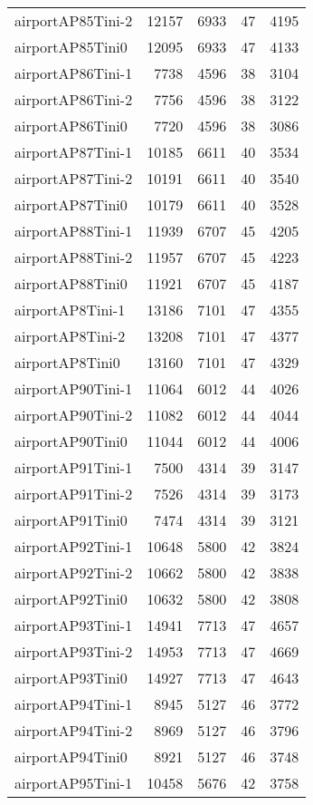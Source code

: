\begin{longtable}{lrrrr}
airportAP85Tini-2 & 12157 & 6933 & 47 & 4195 \\
airportAP85Tini0 & 12095 & 6933 & 47 & 4133 \\
airportAP86Tini-1 & 7738 & 4596 & 38 & 3104 \\
airportAP86Tini-2 & 7756 & 4596 & 38 & 3122 \\
airportAP86Tini0 & 7720 & 4596 & 38 & 3086 \\
airportAP87Tini-1 & 10185 & 6611 & 40 & 3534 \\
airportAP87Tini-2 & 10191 & 6611 & 40 & 3540 \\
airportAP87Tini0 & 10179 & 6611 & 40 & 3528 \\
airportAP88Tini-1 & 11939 & 6707 & 45 & 4205 \\
airportAP88Tini-2 & 11957 & 6707 & 45 & 4223 \\
airportAP88Tini0 & 11921 & 6707 & 45 & 4187 \\
airportAP8Tini-1 & 13186 & 7101 & 47 & 4355 \\
airportAP8Tini-2 & 13208 & 7101 & 47 & 4377 \\
airportAP8Tini0 & 13160 & 7101 & 47 & 4329 \\
airportAP90Tini-1 & 11064 & 6012 & 44 & 4026 \\
airportAP90Tini-2 & 11082 & 6012 & 44 & 4044 \\
airportAP90Tini0 & 11044 & 6012 & 44 & 4006 \\
airportAP91Tini-1 & 7500 & 4314 & 39 & 3147 \\
airportAP91Tini-2 & 7526 & 4314 & 39 & 3173 \\
airportAP91Tini0 & 7474 & 4314 & 39 & 3121 \\
airportAP92Tini-1 & 10648 & 5800 & 42 & 3824 \\
airportAP92Tini-2 & 10662 & 5800 & 42 & 3838 \\
airportAP92Tini0 & 10632 & 5800 & 42 & 3808 \\
airportAP93Tini-1 & 14941 & 7713 & 47 & 4657 \\
airportAP93Tini-2 & 14953 & 7713 & 47 & 4669 \\
airportAP93Tini0 & 14927 & 7713 & 47 & 4643 \\
airportAP94Tini-1 & 8945 & 5127 & 46 & 3772 \\
airportAP94Tini-2 & 8969 & 5127 & 46 & 3796 \\
airportAP94Tini0 & 8921 & 5127 & 46 & 3748 \\
airportAP95Tini-1 & 10458 & 5676 & 42 & 3758 \\

\end{longtable}
